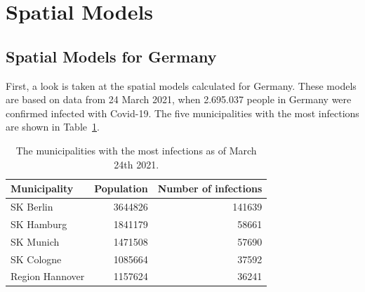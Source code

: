 \section{Spatial Models}\label{ch:spatial}
\subsection{Spatial Models for Germany}
First, a look is taken at the spatial models calculated for Germany. These models are based on data from 24 March 2021, when 2.695.037 people in Germany were confirmed infected with Covid-19. The five municipalities with the most infections are shown in Table~\ref{top5germany}.
\begin{table}[H] 
\caption{The municipalities with the most infections as of March 24th 2021. \label{top5germany}}
\begin{tabular}{l r r}
\toprule
\textbf{Municipality}	& \textbf{Population}	& \textbf{Number of infections} \\
\midrule
SK Berlin & 3644826 & 141639   \\     
SK Hamburg & 1841179 & 58661   \\
SK Munich & 1471508 & 57690   \\
SK Cologne & 1085664 & 37592   \\
Region Hannover & 1157624 & 36241   \\
\bottomrule
\end{tabular}
\end{table}
